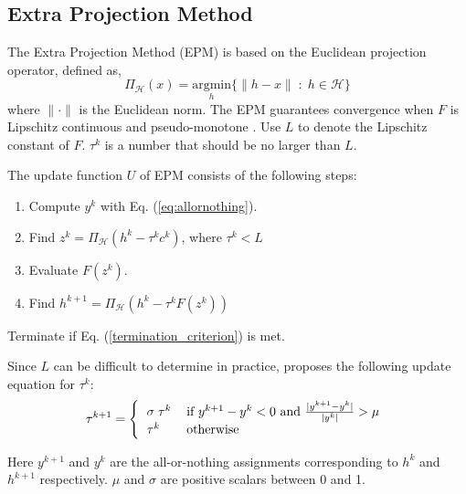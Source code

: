 \subsection{Extra Projection Method}
The Extra Projection Method (EPM) is based on the Euclidean projection operator, defined as,
\begin{equation}
\Pi_\mathcal{H}(x) = \underset{h}{\text{argmin}}\{\lVert h-x\rVert \; : \;h \in\mathcal{H} \}
\end{equation}
where $\lVert\cdot\rVert$ is the Euclidean norm. The EPM guarantees convergence when $F$ is Lipschitz continuous and pseudo-monotone \cite{nie2010solving}. Use $L$ to denote the Lipschitz constant of $F$. $\tau^k$ is a number that should be no larger than $L$.

The update function $U$ of EPM consists of the following steps:

\begin{enumerate}
\item Compute $y^k$ with Eq. (\ref{eq:allornothing}).
\item Find $z^k = \Pi_\mathcal{H}(h^k - \tau^k c^k)$, where $\tau^k < L$ 
\item Evaluate $F(z^k)$.
\item Find $h^{k+1} = \Pi_\mathcal{H}(h^k - \tau^k F(z^k))$
\end{enumerate}
Terminate if Eq. (\ref{termination_criterion}) is met.

Since $L$ can be difficult to determine in practice, \cite{nie2010solving} proposes the following update equation for $\tau^k$:
\begin{equation}
\tau^{k+1} = \left\{
\begin{tabular}{ll}
$\sigma\;\tau^k$ & 
if $y^{k+1}-y^k < 0$ and $\frac{|y^{k+1}-y^k|}{|y^k|}> \mu$ \\
$\tau^k$ & otherwise
\end{tabular}
\right.
\end{equation}

Here $y^{k+1}$ and $y^k$ are the all-or-nothing assignments corresponding to $h^k$ and $h^{k+1}$ respectively. $\mu$ and $\sigma$ are positive scalars between 0 and 1.

